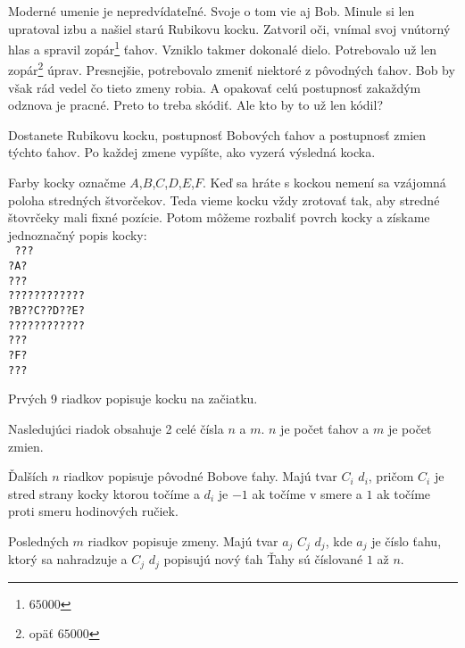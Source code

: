 





Moderné umenie je nepredvídateľné.
Svoje o tom vie aj Bob.
Minule si len upratoval izbu
a našiel starú Rubikovu kocku.
Zatvoril oči, vnímal svoj vnútorný hlas
a spravil zopár\footnote{$65000$} ťahov.
Vzniklo takmer dokonalé dielo.
Potrebovalo už len zopár\footnote{opäť $65000$} úprav.
Presnejšie, potrebovalo zmeniť niektoré z pôvodných ťahov.
Bob by však rád vedel čo tieto zmeny robia.
A opakovať celú postupnosť zakaždým odznova je pracné.
Preto to treba skódiť.
Ale kto by to už len kódil?


Dostanete Rubikovu kocku, postupnosť
Bobových ťahov a postupnosť zmien týchto ťahov.
Po každej zmene vypíšte, ako vyzerá výsledná kocka.


Farby kocky označme $A$,$B$,$C$,$D$,$E$,$F$.
Keď sa hráte s kockou nemení
sa vzájomná poloha stredných štvorčekov.
Teda vieme kocku vždy zrotovať tak,
aby stredné štovrčeky mali fixné pozície.
Potom môžeme rozbaliť povrch kocky a získame
jednoznačný popis kocky:\\
\texttt{
???\\
?A?\\
???\\
????????????\\
?B??C??D??E?\\
????????????\\
???\\
?F?\\
???\\
}


Prvých 9 riadkov popisuje kocku na začiatku.

Nasledujúci riadok obsahuje 2 celé čísla $n$ a $m$.
$n$ je počet ťahov a $m$ je počet zmien.

Ďalších $n$ riadkov popisuje pôvodné Bobove ťahy.
Majú tvar $C_i$ $d_i$,
pričom $C_i$ je stred strany kocky ktorou točíme
a $d_i$ je $-1$ ak točíme v smere a 
$1$ ak točíme proti smeru hodinových ručiek.

Posledných $m$ riadkov popisuje zmeny.
Majú tvar $a_j$ $C_j$ $d_j$,
kde $a_j$ je číslo ťahu, ktorý sa nahradzuje
a $C_j$ $d_j$ popisujú nový ťah
Ťahy sú číslované $1$ až $n$.

